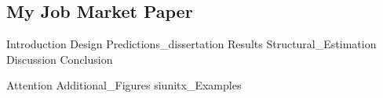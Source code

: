 \documentclass[11pt, a4paper, twoside]{book}
\begin{document}
%
%




\renewcommand{\currentchapter}{Ch1}

\begin{refsection}

\makeatletter
\renewcommand{\@makefntext}[1]{\@makefntextorig{#1}}
\makeatother
\chapter
	[My Job Market Paper]
	{My Job Market Paper%
	 \setcounter{footnote}{1}\textsuperscript{\Large{}}%
	}
\label{diss:JMP}
\renewcommand{\thefootnote}{\fnsymbol{footnote}}
\footnotetext[1]{\:\protect}
\renewcommand{\thefootnote}{\thefootnoteorig}
\makeatletter
\renewcommand{\@makefntext}[1]{\@makefntextcustom{#1}}
\makeatother
\setcounter{footnote}{0}

\begin{abstract}
	
\end{abstract}

\clearpage

\graphicspath{{1_Example_Content/}}
{Introduction}
{Design}
{Predictions_dissertation}
{Results}
{Structural_Estimation}
{Discussion}
{Conclusion}

\FloatBarrier
\clearpage

\begin{subappendices}
	\label{sec:appendix}
	{Attention}
	\FloatBarrier
	\clearpage
	{Additional_Figures}
	\FloatBarrier
	\clearpage
	{siunitx_Examples}
	\clearpage
	\FloatBarrier
\end{subappendices}


\end{refsection}
\end{document}
